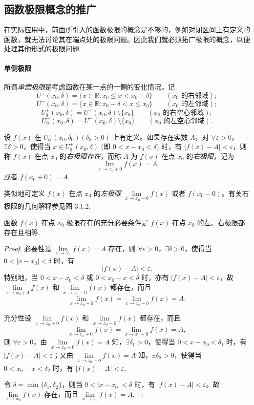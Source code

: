 \subsection{函数极限概念的推广}
\label{subsec:ma-3-1-3}

在实际应用中，前面所引入的函数极限的概念是不够的，例如对闭区间上有定义的函数，就无法讨论其在端点处的极限问题。因此我们就必须拓广极限的概念，以便处理其他形式的极限问题.

\paragraph*{单侧极限}


所谓\emph{单侧极限}是考虑函数在某一点的一侧的变化情况。记
\[
  U^+(x_0,\delta)=\{x\in\mathbb{R}:x_0\leqslant x<x_0+\delta\}\qquad (x_0\text{ 的右邻域});
\]
\[
  U^-(x_0,\delta)=\{x\in\mathbb{R}:x_0-\delta<x\leqslant x_0\}\qquad (x_0\text{ 的左邻域});
\]
\[
  U_0^+(x_0,\delta)=U^+(x_0,\delta)\setminus\{x_0\}\qquad (x_0\text{ 的右空心邻域});
\]
\[
  U_0^-(x_0,\delta)=U^-(x_0,\delta)\setminus\{x_0\}\qquad (x_0\text{ 的左空心邻域}).
\]

\begin{definition}\label{definition:ma-3-1-2}
设 $f(x)$ 在 $U_0^+(x_0,\delta_0)(\delta_0>0)$ 上有定义。如果存在实数 $A$，对 $\forall\varepsilon>0$，$\exists\delta>0$，使得当 $x\in U_0^+(x_0,\delta)$ (即 $0<x-x_0<\delta$) 时，有 $|f(x)-A|<\varepsilon$，则称 $f(x)$ 在点 $x_0$ 的\emph{右极限存在}，而称 $A$ 为 $f(x)$ 在点 $x_0$ 的\emph{右极限}，记为
\[
  \lim_{x\to x_0+0}f(x)=A
\]
或者 $f(x_0+0)=A$.
\end{definition}

类似地可定义 $f(x)$ 在点 $x_0$ 的\emph{左极限} $\lim\limits_{x\to x_0-0}f(x)$ 或者 $f(x_0-0)$。有关右极限的几何解释参见图 3.1.2.

\begin{theorem}\label{theorem:ma-3-1-6}
函数 $f(x)$ 在点 $x_0$ 极限存在的充分必要条件是 $f(x)$ 在点 $x_0$ 的左、右极限都存在且相等.
\end{theorem}


\begin{proof}
必要性\quad 设 $\lim\limits_{x\to x_0}f(x)=A$ 存在，则 $\forall\varepsilon>0$，$\exists\delta>0$，使得当 $0<|x-x_0|<\delta$ 时，有
\[
  |f(x)-A|<\varepsilon.
\]
特别地，当 $0<x-x_0<\delta$ 或 $0<x_0-x<\delta$ 时，亦有 $|f(x)-A|<\varepsilon$，故 $\lim\limits_{x\to x_0+0}f(x)$ 和 $\lim\limits_{x\to x_0-0}f(x)$ 都存在，而且
\[
  \lim_{x\to x_0+0}f(x)=\lim_{x\to x_0-0}f(x)=A.
\]

充分性\quad 设 $\lim\limits_{x\to x_0+0}f(x)$ 和 $\lim\limits_{x\to x_0-0}f(x)$ 都存在，而且
\[
  \lim_{x\to x_0+0}f(x)=\lim_{x\to x_0-0}f(x)=A,
\]
则 $\forall\varepsilon>0$，由 $\lim\limits_{x\to x_0+0}f(x)=A$ 知，$\exists\delta_1>0$，使得当 $0<x-x_0<\delta_1$ 时，有 $|f(x)-A|<\varepsilon$；又由 $\lim\limits_{x\to x_0-0}f(x)=A$ 知，$\exists\delta_2>0$，使得当 $0<x_0-x<\delta_2$ 时，有 $|f(x)-A|<\varepsilon$.

令 $\delta=\min\{\delta_1,\delta_2\}$，则当 $0<|x-x_0|<\delta$ 时，有 $|f(x)-A|<\varepsilon$。故 $\lim\limits_{x\to x_0}f(x)$ 存在，而且 $\lim\limits_{x\to x_0}f(x)=A$.
\end{proof}


